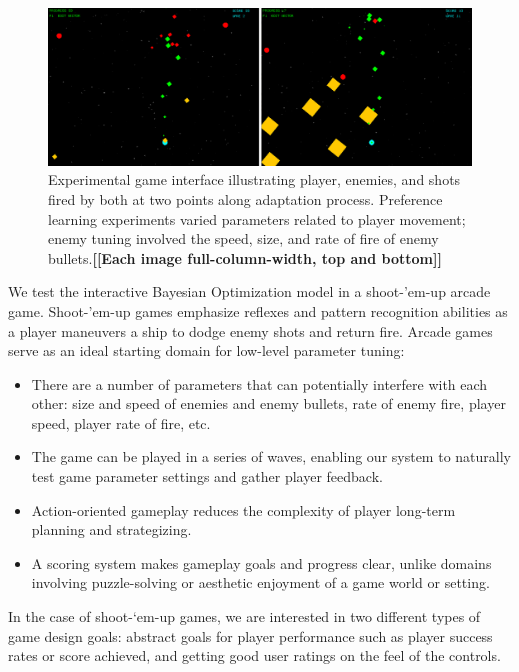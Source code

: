 \documentclass{sig-alternate}
\newcommand{\mytodo}[1]{\textbf{[[#1]]}}
\begin{document}
\begin{figure}[t]
\centering
\includegraphics[width=1\linewidth]{./bullethell_sidebyside}
\caption{Experimental game interface illustrating player, enemies, and shots fired by both at two points along adaptation process. Preference learning experiments varied parameters related to player movement; enemy tuning involved the speed, size, and rate of fire of enemy bullets.\mytodo{Each image full-column-width, top and bottom}}
\label{fig:shmup}
\end{figure}

We test the interactive Bayesian Optimization model in a shoot-'em-up arcade game.
Shoot-'em-up games emphasize reflexes and pattern recognition abilities as a player maneuvers a ship to dodge enemy shots and return fire.
%
Arcade games serve as an ideal starting domain for low-level parameter tuning:
\begin{itemize}
\item There are a number of parameters that can potentially interfere with each other: size and speed of enemies and enemy bullets, rate of enemy fire, player speed, player rate of fire, etc.
\item The game can be played in a series of waves, enabling our system to naturally test game parameter settings and gather player feedback.
\item Action-oriented gameplay reduces the complexity of player long-term planning and strategizing.
\item A scoring system makes gameplay goals and progress clear, unlike domains involving puzzle-solving or aesthetic enjoyment of a game world or setting.
\end{itemize}
%
%
In the case of shoot-`em-up games, we are interested in two different types of game design goals: abstract goals for player performance such as player success rates or score achieved, and getting good user ratings on the feel of the controls.
\end{document}

